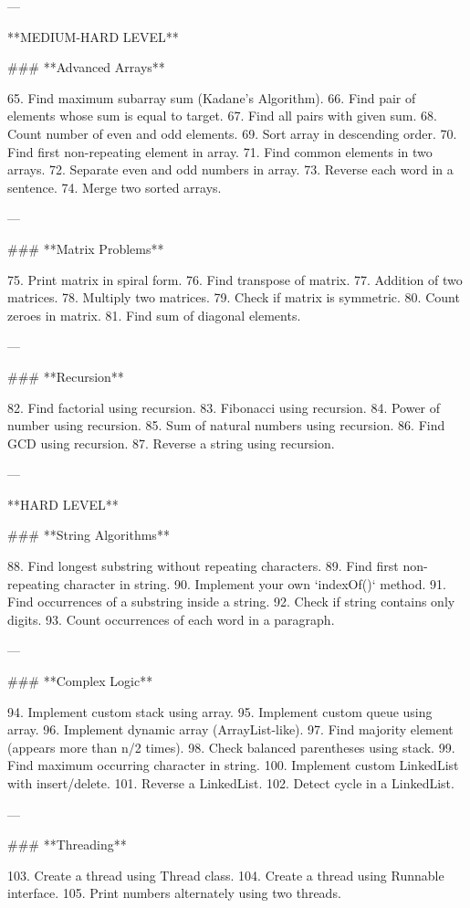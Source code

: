 ---

 **MEDIUM-HARD LEVEL**

### **Advanced Arrays**

65. Find maximum subarray sum (Kadane’s Algorithm).
66. Find pair of elements whose sum is equal to target.
67. Find all pairs with given sum.
68. Count number of even and odd elements.
69. Sort array in descending order.
70. Find first non-repeating element in array.
71. Find common elements in two arrays.
72. Separate even and odd numbers in array.
73. Reverse each word in a sentence.
74. Merge two sorted arrays.

---

### **Matrix Problems**

75. Print matrix in spiral form.
76. Find transpose of matrix.
77. Addition of two matrices.
78. Multiply two matrices.
79. Check if matrix is symmetric.
80. Count zeroes in matrix.
81. Find sum of diagonal elements.

---

### **Recursion**

82. Find factorial using recursion.
83. Fibonacci using recursion.
84. Power of number using recursion.
85. Sum of natural numbers using recursion.
86. Find GCD using recursion.
87. Reverse a string using recursion.

---

 **HARD LEVEL**

### **String Algorithms**

88. Find longest substring without repeating characters.
89. Find first non-repeating character in string.
90. Implement your own `indexOf()` method.
91. Find occurrences of a substring inside a string.
92. Check if string contains only digits.
93. Count occurrences of each word in a paragraph.

---

### **Complex Logic**

94. Implement custom stack using array.
95. Implement custom queue using array.
96. Implement dynamic array (ArrayList-like).
97. Find majority element (appears more than n/2 times).
98. Check balanced parentheses using stack.
99. Find maximum occurring character in string.
100. Implement custom LinkedList with insert/delete.
101. Reverse a LinkedList.
102. Detect cycle in a LinkedList.

---

### **Threading**

103. Create a thread using Thread class.
104. Create a thread using Runnable interface.
105. Print numbers alternately using two threads.

